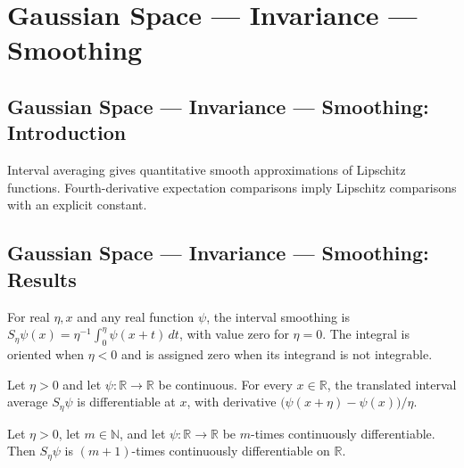 \section{Gaussian Space --- Invariance --- Smoothing}
\subsection*{Gaussian Space --- Invariance --- Smoothing: Introduction}
Interval averaging gives quantitative smooth approximations of Lipschitz functions. Fourth-derivative expectation comparisons imply Lipschitz comparisons with an explicit constant.

\subsection*{Gaussian Space --- Invariance --- Smoothing: Results}

\begin{definition}
\leanok
For real $\eta,x$ and any real function $\psi$, the interval smoothing is $S_\eta\psi(x)=\eta^{-1}\int_0^\eta\psi(x+t)\,dt$, with value zero for $\eta=0$. The integral is oriented when $\eta<0$ and is assigned zero when its integrand is not integrable.
\end{definition}

\begin{theorem}
\leanok
{}
Let $\eta>0$ and let $\psi:\mathbb R\to\mathbb R$ be continuous. For every $x\in\mathbb
R$, the translated interval average $S_\eta\psi$ is differentiable at $x$, with
derivative $\bigl(\psi(x+\eta)-\psi(x)\bigr)/\eta$.
\end{theorem}

\begin{theorem}
\leanok
{}
Let $\eta>0$, let $m\in\mathbb N$, and let $\psi\colon\mathbb R\to\mathbb R$ be
$m$-times continuously differentiable. Then $S_\eta\psi$ is $(m+1)$-times continuously
differentiable on $\mathbb R$.
\end{theorem}

